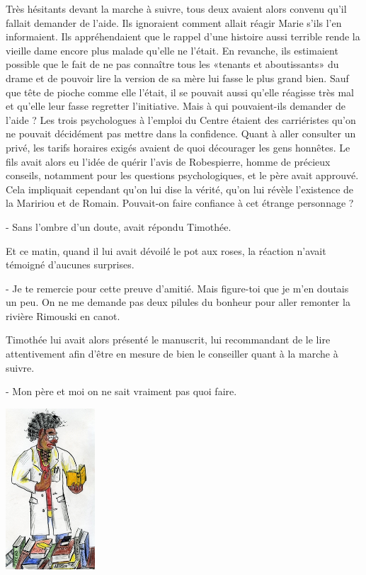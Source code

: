 Très hésitants devant la marche à suivre, tous deux avaient alors convenu qu’il fallait demander de l’aide. Ils ignoraient comment allait réagir Marie s’ils l’en informaient. Ils appréhendaient que le rappel d’une histoire aussi terrible rende la vieille dame encore plus malade qu’elle ne l’était. En revanche, ils estimaient possible que le fait de ne pas connaître tous les «tenants et aboutissants» du drame et de pouvoir lire la version de sa mère lui fasse le plus grand bien. Sauf que tête de pioche comme elle l’était, il se pouvait aussi qu’elle réagisse très mal et qu’elle leur fasse regretter l’initiative. Mais à qui pouvaient-ils demander de l’aide ? Les trois psychologues à l’emploi du Centre étaient des carriéristes qu’on ne pouvait décidément pas mettre dans la confidence. Quant à aller consulter un privé, les tarifs horaires exigés avaient de quoi décourager les gens honnêtes. Le fils avait alors eu l’idée de quérir l’avis de Robespierre, homme de précieux conseils, notamment pour les questions psychologiques, et le père avait approuvé. Cela impliquait cependant qu’on lui dise la vérité, qu’on lui révèle l’existence de la Maririou et de Romain. Pouvait-on faire confiance à cet étrange personnage ?

- Sans l’ombre d’un doute, avait répondu Timothée.

Et ce matin, quand il lui avait dévoilé le pot aux roses, la réaction n’avait témoigné d’aucunes surprises.

- Je te remercie pour cette preuve d’amitié. Mais figure-toi que je m’en doutais un peu. On ne me demande pas deux pilules du bonheur pour aller remonter la rivière Rimouski en canot.

Timothée lui avait alors présenté le manuscrit, lui recommandant de le lire attentivement afin d’être en mesure de bien le conseiller quant à la marche à suivre.

- Mon père et moi on ne sait vraiment pas quoi faire.

\begin{floatingfigure}[l]{40mm}
\includegraphics[height=60mm]{corps/chapitre11/img/personnage-robespierre-psy.jpg}
\end{floatingfigure}

